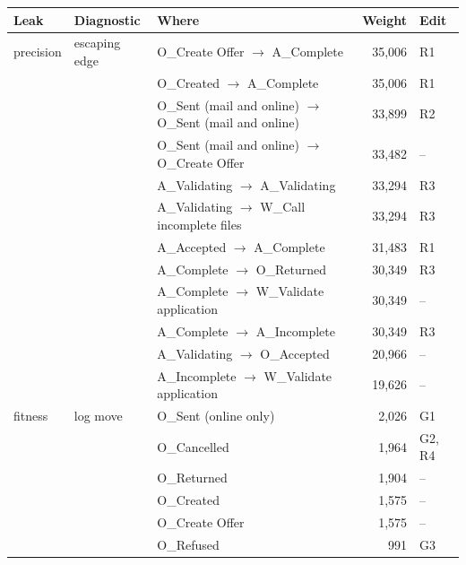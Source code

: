 \begin{tabular}{llp{}rl}
\hline
Leak & Diagnostic & Where & Weight & Edit \\
\hline
precision & escaping edge & O\_Create Offer $\rightarrow$ A\_Complete & 35,006 & R1 \\
 &  & O\_Created $\rightarrow$ A\_Complete & 35,006 & R1 \\
 &  & O\_Sent (mail and online) $\rightarrow$ O\_Sent (mail and online) & 33,899 & R2 \\
 &  & O\_Sent (mail and online) $\rightarrow$ O\_Create Offer & 33,482 & -- \\
 &  & A\_Validating $\rightarrow$ A\_Validating & 33,294 & R3 \\
 &  & A\_Validating $\rightarrow$ W\_Call incomplete files & 33,294 & R3 \\
 &  & A\_Accepted $\rightarrow$ A\_Complete & 31,483 & R1 \\
 &  & A\_Complete $\rightarrow$ O\_Returned & 30,349 & R3 \\
 &  & A\_Complete $\rightarrow$ W\_Validate application & 30,349 & -- \\
 &  & A\_Complete $\rightarrow$ A\_Incomplete & 30,349 & R3 \\
 &  & A\_Validating $\rightarrow$ O\_Accepted & 20,966 & -- \\
 &  & A\_Incomplete $\rightarrow$ W\_Validate application & 19,626 & -- \\
\hline
fitness & log move & O\_Sent (online only) & 2,026 & G1 \\
 &  & O\_Cancelled & 1,964 & G2, R4 \\
 &  & O\_Returned & 1,904 & -- \\
 &  & O\_Created & 1,575 & -- \\
 &  & O\_Create Offer & 1,575 & -- \\
 &  & O\_Refused & 991 & G3 \\
\hline
\end{tabular}
